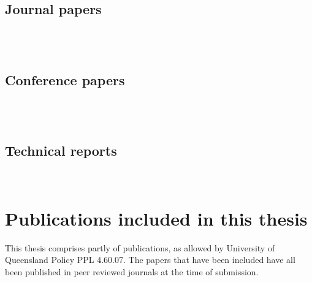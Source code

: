 \subsection*{Journal papers}

\noindent{}\\

\noindent{}\\

\subsection*{Conference papers}

\noindent{}\\

\noindent{}\\

\subsection*{Technical reports}

\noindent{}\\


\section*{Publications included in this thesis}

This thesis comprises partly of publications, as allowed by University of Queensland Policy PPL 4.60.07. The papers that have been included have all been published in peer reviewed journals at the time of submission. 

\vspace{\baselineskip}

